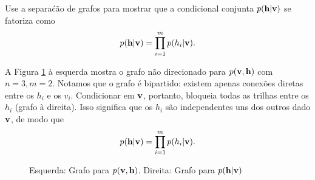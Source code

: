 \begin{exenumerate}
    \item Use a separa\'c\~ao de grafos para mostrar que a condicional conjunta $p(\mathbf{h} | \mathbf{v})$ se fatoriza como
    $$p(\mathbf{h} | \mathbf{v}) = \prod_{i=1}^m p(h_i | \mathbf{v}).$$
    
    \begin{solution}
        A Figura \ref{fig:restricted-boltzmann-machine} \`a esquerda mostra
        o grafo n\~ao direcionado para $p(\mathbf{v},\mathbf{h})$ com $n=3, m=2$. Notamos que
        o grafo \'e bipartido: existem apenas conex\~oes diretas
        entre os $h_i$ e os $v_i$. Condicionar em $\mathbf{v}$, portanto, bloqueia
        todas as trilhas entre os $h_i$ (grafo \`a direita). Isso significa que
        os $h_i$ s\~ao independentes uns dos outros dado $\mathbf{v}$, de modo que
        $$p(\mathbf{h} | \mathbf{v}) = \prod_{i=1}^m p(h_i | \mathbf{v}).$$
        
        \begin{figure}[ht]
            \centering
            \caption{\label{fig:restricted-boltzmann-machine} Esquerda: Grafo para $p(\mathbf{v},\mathbf{h})$. Direita: Grafo para $p(\mathbf{h} | \mathbf{v})$}
        \end{figure}
    \end{solution}
    

\end{exenumerate}
